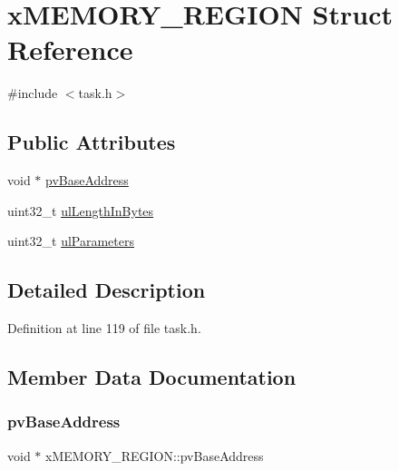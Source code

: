 \hypertarget{structx_m_e_m_o_r_y___r_e_g_i_o_n}{}\section{x\+M\+E\+M\+O\+R\+Y\+\_\+\+R\+E\+G\+I\+ON Struct Reference}
\label{structx_m_e_m_o_r_y___r_e_g_i_o_n}


{\ttfamily \#include $<$task.\+h$>$}

\subsection*{Public Attributes}
\begin{DoxyCompactItemize}
\item 
void $\ast$ \hyperlink{structx_m_e_m_o_r_y___r_e_g_i_o_n_a16d9e901c577580d5114c04c4d5d8867}{pv\+Base\+Address}
\item 
uint32\+\_\+t \hyperlink{structx_m_e_m_o_r_y___r_e_g_i_o_n_a97e59578d3c4c46270d33e7206258a65}{ul\+Length\+In\+Bytes}
\item 
uint32\+\_\+t \hyperlink{structx_m_e_m_o_r_y___r_e_g_i_o_n_a6ba180553e9a318f23acc5f4664934e3}{ul\+Parameters}
\end{DoxyCompactItemize}


\subsection{Detailed Description}


Definition at line 119 of file task.\+h.



\subsection{Member Data Documentation}
\mbox{\label{structx_m_e_m_o_r_y___r_e_g_i_o_n_a16d9e901c577580d5114c04c4d5d8867}} 
\subsubsection{\texorpdfstring{pv\+Base\+Address}{pvBaseAddress}}
{\footnotesize\ttfamily void $\ast$ x\+M\+E\+M\+O\+R\+Y\+\_\+\+R\+E\+G\+I\+O\+N\+::pv\+Base\+Address}



